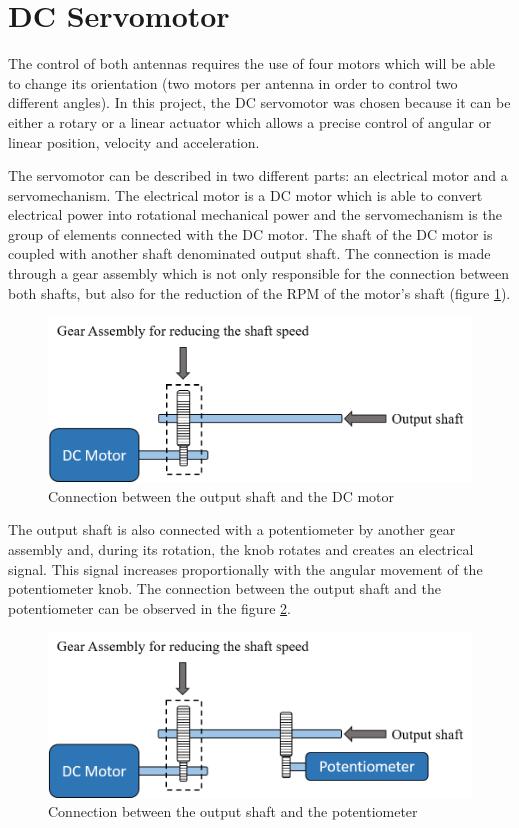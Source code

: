 \section{DC Servomotor}\label{sec:servo_motor}

The control of both antennas requires the use of four motors which will be able to change its orientation (two motors per antenna in order to control two different angles). In this project, the DC servomotor was chosen because it can be either a rotary or a linear actuator which allows a precise control of angular or linear position, velocity and acceleration.

The servomotor can be described in two different parts: an electrical motor and a servomechanism. The electrical motor is a DC motor which is able to convert electrical power into rotational mechanical power and the servomechanism is the group of elements connected with the DC motor. The shaft of the DC motor is coupled with another shaft denominated output shaft. The connection is made through a gear assembly which is not only responsible for the connection between both shafts, but also for the reduction of the RPM of the motor’s shaft (figure \ref{servomotor_expl1}).

\begin{figure}[H]
\centering
\includegraphics[scale=0.7]{figures/servomotor_expl1.png}
\caption{Connection between the output shaft and the DC motor}
\label{servomotor_expl1}
\end{figure}

The output shaft is also connected with a potentiometer by another gear assembly and, during its rotation, the knob rotates and creates an electrical signal. This signal increases proportionally with the angular movement of the potentiometer knob. The connection between the output shaft and the potentiometer can be
observed in the figure \ref{servomotor_expl2}.

\begin{figure}[H]
\centering
\includegraphics[scale=0.61]{figures/servomotor_expl2.png}
\caption{Connection between the output shaft and the potentiometer}
\label{servomotor_expl2}
\end{figure}

